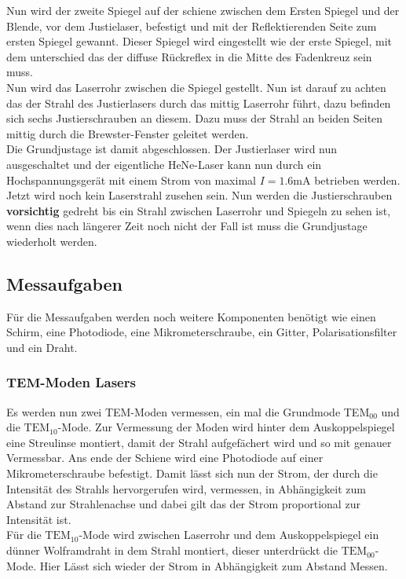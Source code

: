 Nun wird der zweite Spiegel auf der schiene zwischen dem Ersten Spiegel und der Blende, vor dem Justielaser, befestigt und mit der Reflektierenden Seite zum ersten Spiegel gewannt. Dieser Spiegel wird eingestellt wie der erste Spiegel, mit dem unterschied das der diffuse Rückreflex in die Mitte des Fadenkreuz sein muss.\\
Nun wird das Laserrohr zwischen die Spiegel gestellt. Nun ist darauf zu achten das der Strahl des Justierlasers durch das mittig Laserrohr führt, dazu befinden sich sechs Justierschrauben an diesem. Dazu muss der Strahl an beiden Seiten mittig durch die Brewster-Fenster geleitet werden.\\
Die Grundjustage ist damit abgeschlossen. Der Justierlaser wird nun ausgeschaltet und der eigentliche HeNe-Laser kann nun durch ein Hochspannungsgerät mit einem Strom von maximal $I=1.6$mA betrieben werden. Jetzt wird noch kein Laserstrahl zusehen sein. Nun werden die Justierschrauben \textbf{vorsichtig} gedreht bis ein Strahl zwischen Laserrohr und Spiegeln zu sehen ist, wenn dies nach längerer Zeit noch nicht der Fall ist muss die Grundjustage wiederholt werden.\\


\subsection{Messaufgaben}
Für die Messaufgaben werden noch weitere Komponenten benötigt wie einen Schirm, eine Photodiode, eine Mikrometerschraube, ein Gitter, Polarisationsfilter und ein Draht.
\subsubsection{$\mathbf{TEM}$-Moden Lasers}
Es werden nun zwei TEM-Moden vermessen, ein mal die Grundmode TEM${}_{00}$ und die $\mathrm{TEM}_{10}$-Mode. Zur Vermessung der Moden wird hinter dem Auskoppelspiegel eine Streulinse montiert, damit der Strahl aufgefächert wird und so mit genauer Vermessbar. Ans ende der Schiene wird eine Photodiode auf einer Mikrometerschraube befestigt. Damit lässt sich nun der Strom, der durch die Intensität des Strahls hervorgerufen wird, vermessen, in Abhängigkeit zum Abstand zur Strahlenachse und dabei gilt das der Strom proportional zur Intensität ist. \\
Für die $\mathrm{TEM}_{10}$-Mode wird zwischen Laserrohr und dem Auskoppelspiegel ein dünner Wolframdraht in dem Strahl montiert, dieser unterdrückt die $\mathrm{TEM}_{00}$-Mode. Hier Lässt sich wieder der Strom in Abhängigkeit zum Abstand Messen.
